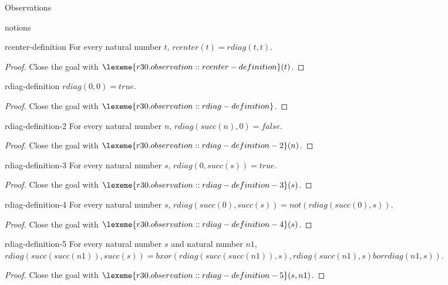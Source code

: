 \begin{lexlean}{Observations}
\begin{section}{notions}
\begin{lemma}{rcenter-definition}
For every natural number \(t\), \(rcenter(t) = rdiag(t, t)\).
\begin{proof}
Close the goal with \(\lexeme{r30.observation::rcenter-definition}(t)\).
\end{proof}
\end{lemma}

\begin{lemma}{rdiag-definition}
\(rdiag(0, 0) = true\).
\begin{proof}
Close the goal with \(\lexeme{r30.observation::rdiag-definition}\).
\end{proof}
\end{lemma}

\begin{lemma}{rdiag-definition-2}
For every natural number \(n\), \(rdiag(succ(n), 0) = false\).
\begin{proof}
Close the goal with \(\lexeme{r30.observation::rdiag-definition-2}(n)\).
\end{proof}
\end{lemma}

\begin{lemma}{rdiag-definition-3}
For every natural number \(s\), \(rdiag(0, succ(s)) = true\).
\begin{proof}
Close the goal with \(\lexeme{r30.observation::rdiag-definition-3}(s)\).
\end{proof}
\end{lemma}

\begin{lemma}{rdiag-definition-4}
For every natural number \(s\), \(rdiag(succ(0), succ(s)) = not(rdiag(succ(0), s))\).
\begin{proof}
Close the goal with \(\lexeme{r30.observation::rdiag-definition-4}(s)\).
\end{proof}
\end{lemma}

\begin{lemma}{rdiag-definition-5}
For every natural number \(s\) and natural number \(n1\), \(rdiag(succ(succ(n1)), succ(s)) = bxor(rdiag(succ(succ(n1)), s), rdiag(succ(n1), s) bor rdiag(n1, s))\).
\begin{proof}
Close the goal with \(\lexeme{r30.observation::rdiag-definition-5}(s, n1)\).
\end{proof}
\end{lemma}


\end{section}
\end{lexlean}
